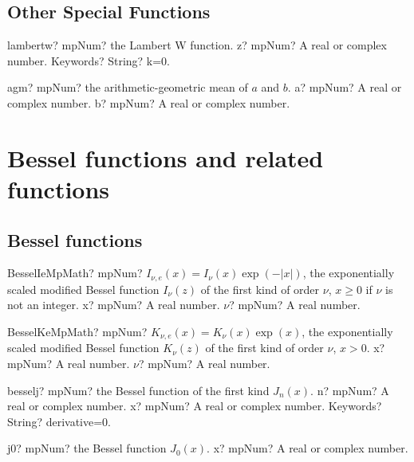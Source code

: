 \documentclass[12pt,a4paper,openany]{book}
\begin{document}
\section{Other Special Functions}

\begin{mpFunctionsExtract}
\mpFunctionTwo
{lambertw? mpNum? the Lambert W function.}
{z? mpNum? A real or complex number.}
{Keywords? String? k=0.}
\end{mpFunctionsExtract}

\begin{mpFunctionsExtract}
\mpFunctionTwo
{agm? mpNum? the arithmetic-geometric mean of $a$ and $b$.}
{a? mpNum? A real or complex number.}
{b? mpNum? A real or complex number.}
\end{mpFunctionsExtract}

\chapter{Bessel functions and related functions}

\section{Bessel functions}

\begin{mpFunctionsExtract}
\mpFunctionTwoNotImplemented
{BesselIeMpMath? mpNum? $I_{\nu, e}(x) = I_{\nu}(x) \exp(-|x|)$, the exponentially scaled modified Bessel function $I_{\nu}(z)$ of the first kind of order $\nu$, $x \geq 0$ if $\nu$ is not an integer.}
{x? mpNum? A real number.}
{$\nu$? mpNum? A real number.}
\end{mpFunctionsExtract}

\begin{mpFunctionsExtract}
\mpFunctionTwoNotImplemented
{BesselKeMpMath? mpNum? $K_{\nu, e}(x) = K_{\nu}(x) \exp(x)$, the exponentially scaled modified Bessel function $K_{\nu}(z)$ of the first kind of order $\nu$, $x > 0$.}
{x? mpNum? A real number.}
{$\nu$? mpNum? A real number.}
\end{mpFunctionsExtract}

\begin{mpFunctionsExtract}
\mpFunctionThree
{besselj? mpNum? the Bessel function of the first kind $J_n(x)$.}
{n? mpNum? A real or complex number.}
{x? mpNum? A real or complex number.}
{Keywords? String? derivative=0.}
\end{mpFunctionsExtract}

\begin{mpFunctionsExtract}
\mpFunctionOne
{j0? mpNum? the Bessel function $J_0(x)$.}
{x? mpNum? A real or complex number.}
\end{mpFunctionsExtract}
\end{document}
